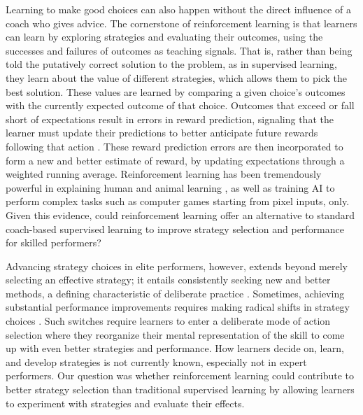 \documentclass{article}
\begin{document}
Learning to make good choices can also happen without the direct influence of a coach who gives advice. The cornerstone of reinforcement learning \cite{sutton_reinforcement_2018} is that learners can learn by exploring strategies and evaluating their outcomes, using the successes and failures of outcomes as teaching signals. That is, rather than being told the putatively correct solution to the problem, as in supervised learning, they learn about the value of different strategies, which allows them to pick the best solution. These values are learned by comparing a given choice's outcomes with the currently expected outcome of that choice. Outcomes that exceed or fall short of expectations result in errors in reward prediction, signaling that the learner must update their predictions to better anticipate future rewards following that action \cite{rescorla_theory_1972}. These reward prediction errors are then incorporated to form a new and better estimate of reward, by updating expectations through a weighted running average. Reinforcement learning has been tremendously powerful in explaining human and animal learning \cite{waelti_dopamine_2001, schultz_neural_1997, pessiglione_dopamine-dependent_2006}, as well as training AI to perform complex tasks such as computer games starting from pixel inputs, only\cite{mnih_human-level_2015}. Given this evidence, could reinforcement learning offer an alternative to standard coach-based supervised learning to improve strategy selection and performance for skilled performers?

Advancing strategy choices in elite performers, however, extends beyond merely selecting an effective strategy; it entails consistently seeking new and better methods, a defining characteristic of deliberate practice \cite{ericsson_development_2003, ericsson_expert_1994, ericsson_role_1993}. Sometimes, achieving substantial performance improvements requires making radical shifts in strategy choices \cite{taylor_role_2012, gray_plateaus_2017}. Such switches require learners to enter a deliberate mode of action selection where they reorganize their mental representation of the skill to come up with even better strategies and performance\cite{du_relationship_2022}. How learners decide on, learn, and develop strategies is not currently known\cite{taylor_role_2012}, especially not in expert performers. Our question was whether reinforcement learning could contribute to better strategy selection than traditional supervised learning by allowing learners to experiment with strategies and evaluate their effects. 
\end{document}
